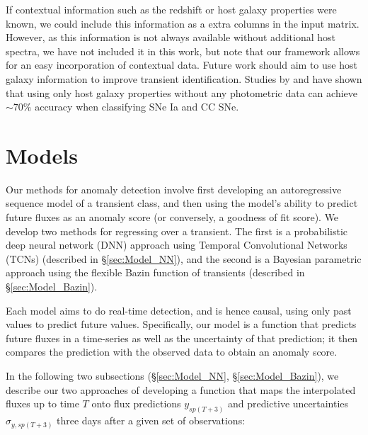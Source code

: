 \documentclass[fleqn,usenatbib]{mnras}
\begin{document}
If contextual information such as the redshift or host galaxy properties were known, we could include this information as a extra columns in the input matrix. However, as this information is not always available without additional host spectra, we have not included it in this work, but note that our framework allows for an easy incorporation of contextual data. Future work should aim to use host galaxy information to improve transient identification. Studies by \citealt{Foley2013ClassifyingData} and \citealt{Gagliano2021} have shown that using only host galaxy properties without any photometric data can achieve $\sim 70\%$ accuracy when classifying SNe Ia and CC SNe. 

\section{Models}
\label{sec:Models}

Our methods for anomaly detection involve first developing an autoregressive sequence model of a transient class, and then using the model's ability to predict future fluxes as an anomaly score (or conversely, a goodness of fit score). We develop two methods for regressing over a transient. The first is a probabilistic deep neural network (DNN) approach using Temporal Convolutional Networks (TCNs) (described in \S\ref{sec:Model_NN}), and the second is a Bayesian parametric approach using the flexible Bazin function \cite{Bazin_function} of transients (described in \S\ref{sec:Model_Bazin}). 

Each model aims to do real-time detection, and is hence causal, using only past values to predict future values. Specifically, our model is a function that predicts future fluxes in a time-series as well as the uncertainty of that prediction; it then compares the prediction with the observed data to obtain an anomaly score. 

In the following two subsections (\S \ref{sec:Model_NN}, \S \ref{sec:Model_Bazin}), we describe our two approaches of developing a function that maps the interpolated fluxes up to time $T$ onto flux predictions $y_{sp(T+3)}$ and predictive uncertainties $\sigma_{y,{sp(T+3)}}$ three days after a given set of observations:
\end{document}
